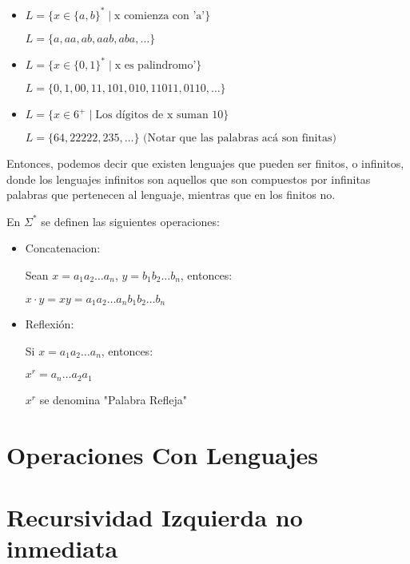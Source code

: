 \documentclass[12pt]{article}
\begin{document}
\begin{ejemplo}
  \begin{itemize}
    \item $L = \{ x \in \{a, b\}^* \mid \text{x comienza con 'a'} \}$

    $L = \{a, aa, ab, aab, aba, \dots\}$
    \item $L = \{ x \in \{0, 1\}^* \mid \text{x es palindromo'} \}$
    
    $L = \{0, 1, 00, 11, 101, 010, 11011, 0110, \dots\}$
    \item $L = \{ x \in 6^+ \mid \text{Los dígitos de x suman 10}\}$
    
    $L = \{64, 22222, 235, \dots\} \text{ (Notar que las palabras acá son finitas)}$
  \end{itemize}
\end{ejemplo}

\vspace{1em}
Entonces, podemos decir que existen lenguajes que pueden ser finitos, o infinitos, donde los lenguajes infinitos son aquellos que son compuestos por infinitas palabras que pertenecen al lenguaje, mientras que en los finitos no.
\vspace{2em}

\hspace{1em}
En $\Sigma^*$ se definen las siguientes operaciones:
\begin{itemize}
  \item Concatenacion:
  \begin{center}
    Sean $x = a_1a_2 \dots a_n$, $y = b_1b_2 \dots b_n$, entonces:

    $x\cdot y = xy = a_1a_2 \dots a_nb_1b_2 \dots b_n$
  \end{center}
  \item Reflexión:
  \begin{center}
    Si $x = a_1a_2 \dots a_n$, entonces:

    $x^r  = a_n\dots a_2a_1$

    $x^r$ se denomina "Palabra Refleja"
  \end{center}
\end{itemize}

\section{Operaciones Con Lenguajes}

\newpage
\section{Recursividad Izquierda no inmediata}
\end{document}
